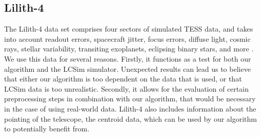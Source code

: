 \subsection{Lilith-4}
\label{sec:lilith-4}

The Lilith-4 data set comprises four sectors of simulated TESS data, and takes into account readout errors, spacecraft jitter, focus errors, diffuse light, cosmic rays, stellar variability, transiting exoplanets, eclipsing binary stars, and more \citep{osborn2020rapid}. We use this data for several reasons. Firstly, it functions as a test for both our algorithm and the LCSim simulator. Unexpected results can lead us to believe that either our algorithm is too dependent on the data that is used, or that LCSim data is too unrealistic. Secondly, it allows for the evaluation of certain preprocessing steps in combination with our algorithm, that would be necessary in the case of using real-world data. Lilith-4 also includes information about the pointing of the telescope, the centroid data, which can be used by our algorithm to potentially benefit from.
